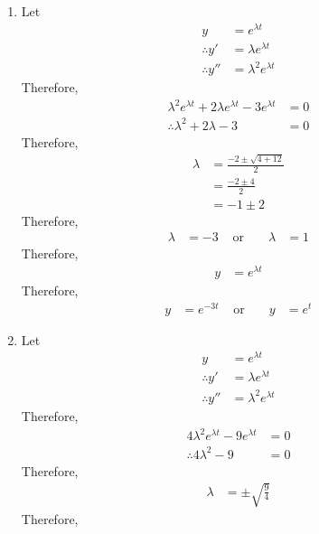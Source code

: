 \documentclass[fleqn, a4paper, 11pt, oneside]{amsart}
\theoremstyle{definition}
\theoremstyle{theorem}
\begin{document}
\begin{solution}
	\begin{enumerate}[leftmargin = *]
		\item
			Let
			\begin{align*}
				y              & = e^{\lambda t}         \\
				\therefore y'  & = \lambda e^{\lambda t} \\
				\therefore y'' & = \lambda^2 e^{\lambda t}
			\end{align*}
			Therefore,
			\begin{align*}
				\lambda^2 e^{\lambda t} + 2 \lambda e^{\lambda t} - 3 e^{\lambda t} & = 0 \\
				\therefore \lambda^2 + 2 \lambda - 3                                & = 0
			\end{align*}
			Therefore,
			\begin{align*}
				\lambda & = \frac{-2 \pm \sqrt{4 + 12}}{2} \\
                                        & = \frac{-2 \pm 4}{2}             \\
                                        & = -1 \pm 2
			\end{align*}
			Therefore,
			\begin{align*}
				\lambda & = -3 & \text{ or } &  & \lambda & = 1
			\end{align*}
			Therefore,
			\begin{align*}
				y & = e^{\lambda t}
			\end{align*}
			Therefore,
			\begin{align*}
				y & = e^{-3 t} & \text{ or } &  & y & = e^{t}
			\end{align*}
		\item
			Let
			\begin{align*}
				y              & = e^{\lambda t}         \\
				\therefore y'  & = \lambda e^{\lambda t} \\
				\therefore y'' & = \lambda^2 e^{\lambda t}
			\end{align*}
			Therefore,
			\begin{align*}
				4 \lambda^2 e^{\lambda t} - 9 e^{\lambda t} & = 0 \\
				\therefore 4 \lambda^2 - 9                  & = 0
			\end{align*}
			Therefore,
			\begin{align*}
				\lambda & = \pm \sqrt{\frac{9}{4}}
			\end{align*}
			Therefore,

\end{enumerate}
\end{solution}
\end{document}
